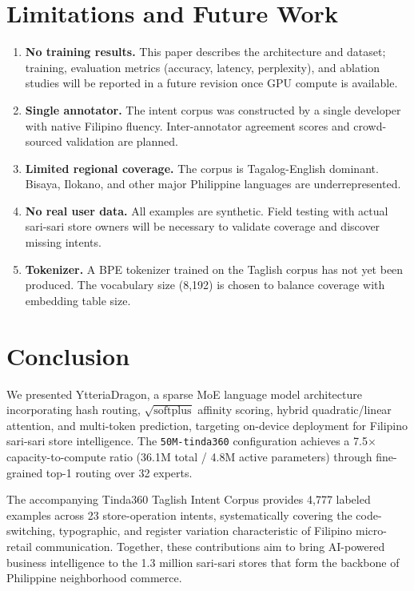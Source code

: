 \documentclass[11pt,a4paper]{article}
\begin{document}
\section{Limitations and Future Work}
\label{sec:limitations}

\begin{enumerate}[leftmargin=*]
  \item \textbf{No training results.} This paper describes the architecture
    and dataset; training, evaluation metrics (accuracy, latency, perplexity),
    and ablation studies will be reported in a future revision once GPU
    compute is available.
  \item \textbf{Single annotator.} The intent corpus was constructed by a
    single developer with native Filipino fluency. Inter-annotator agreement
    scores and crowd-sourced validation are planned.
  \item \textbf{Limited regional coverage.} The corpus is Tagalog-English
    dominant. Bisaya, Ilokano, and other major Philippine languages are
    underrepresented.
  \item \textbf{No real user data.} All examples are synthetic. Field testing
    with actual sari-sari store owners will be necessary to validate coverage
    and discover missing intents.
  \item \textbf{Tokenizer.} A BPE tokenizer trained on the Taglish corpus
    has not yet been produced. The vocabulary size (8{,}192) is chosen to
    balance coverage with embedding table size.
\end{enumerate}

\section{Conclusion}
\label{sec:conclusion}

We presented YtteriaDragon, a sparse MoE language model architecture
incorporating hash routing, $\sqrt{\mathrm{softplus}}$ affinity scoring,
hybrid quadratic/linear attention, and multi-token prediction, targeting
on-device deployment for Filipino sari-sari store intelligence. The
\texttt{50M-tinda360} configuration achieves a 7.5$\times$ capacity-to-compute
ratio (36.1M total / 4.8M active parameters) through fine-grained top-1
routing over 32 experts.

The accompanying Tinda360 Taglish Intent Corpus provides 4{,}777 labeled
examples across 23 store-operation intents, systematically covering the
code-switching, typographic, and register variation characteristic of Filipino
micro-retail communication. Together, these contributions aim to bring
AI-powered business intelligence to the 1.3 million sari-sari stores that
form the backbone of Philippine neighborhood commerce.
\end{document}
